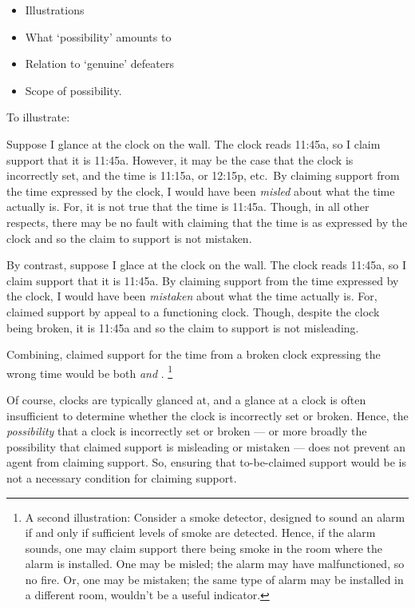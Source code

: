 \begin{note}
  \begin{itemize}
  \item Illustrations
  \item What `possibility' amounts to
  \item Relation to `genuine' defeaters
  \item Scope of possibility.
  \end{itemize}
\end{note}

\begin{note}[M\&M Illustration]
  To illustrate:

  Suppose I glance at the clock on the wall.
  The clock reads 11:45a, so I claim support that it is 11:45a.
  However, it may be the case that the clock is incorrectly set, and the time is 11:15a, or 12:15p, etc.\
  By claiming support from the time expressed by the clock, I would have been \emph{misled} about what the time actually is.
  For, it is not true that the time is 11:45a.
  Though, in all other respects, there may be no fault with claiming that the time is as expressed by the clock and so the claim to support is not mistaken.

  By contrast, suppose I glace at the clock on the wall.
  The clock reads 11:45a, so I claim support that it is 11:45a.
  By claiming support from the time expressed by the clock, I would have been \emph{mistaken} about what the time actually is.
  For, claimed support by appeal to a functioning clock.
  Though, despite the clock being broken, it is 11:45a and so the claim to support is not misleading.

  Combining, claimed support for the time from a broken clock expressing the wrong time would be both \misled{} \emph{and} \mistaken{}.\nolinebreak
  \footnote{
    A second illustration:
    Consider a smoke detector, designed to sound an alarm if and only if sufficient levels of smoke are detected.
    Hence, if the alarm sounds, one may claim support there being smoke in the room where the alarm is installed.
    One may be misled; the alarm may have malfunctioned, so no fire.
    Or, one may be mistaken; the same type of alarm may be installed in a different room, wouldn't be a useful indicator.
  }

  {
    \color{red}
    Of course, clocks are typically glanced at, and a glance at a clock is often insufficient to determine whether the clock is incorrectly set or broken.
    Hence, the \emph{possibility} that a clock is incorrectly set or broken --- or more broadly the possibility that claimed support is misleading or mistaken --- does not prevent an agent from claiming support.
    So, ensuring that to-be-claimed support would be \mom{} is not a necessary condition for claiming support.
  }
\end{note}


